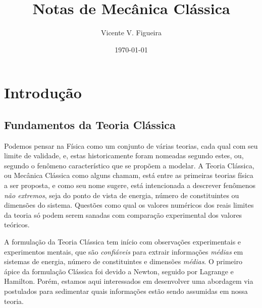 \documentclass[twoside]{amsart}
\title{
Notas de Mecânica Clássica
}
\author{
  Vicente V. Figueira
       }
\date{\today}
\numberwithin{equation}{section}
\begin{document}
\maketitle

\tableofcontents


\section{Introdução}

\subsection{Fundamentos da Teoria Clássica}

Podemos pensar na Física como um conjunto de várias teorias, cada qual com seu limite de 
validade, e, estas historicamente foram nomeadas segundo estes, ou, segundo o fenômeno 
característico que se propõem a modelar. A Teoria Clássica, ou Mecânica Clássica como 
alguns chamam, está entre as primeiras teorias física a ser proposta, e como seu nome 
sugere, está intencionada a descrever fenômenos \emph{não extremos}, seja do ponto de 
vista de energia, número de constituintes ou dimensões do sistema. Questões como qual 
os valores numéricos dos reais limites da teoria só podem serem sanadas com comparação 
experimental dos valores teóricos.

A formulação da Teoria Clássica tem início com observações experimentais e experimentos 
mentais, que são \emph{confiáveis} para extrair informações \emph{médias} em sistemas de 
energia, número de constituintes e dimensões \emph{médias}. O primeiro ápice da formulação 
Clássica foi devido a Newton, seguido por Lagrange e Hamilton. Porém, estamos aqui interessados 
em desenvolver uma abordagem via postulados para sedimentar quais informações estão sendo 
assumidas em nossa teoria.
\end{document}
